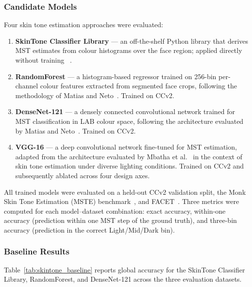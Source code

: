 \subsubsection{Candidate Models}

Four skin tone estimation approaches were evaluated:

\begin{enumerate}
	\item \textbf{SkinTone Classifier Library} --- an off-the-shelf Python library that derives MST estimates from colour histograms over the face region; applied directly without training ~\cite{Pina_2023_SkinToneClassificationLibrary}.
	\item \textbf{RandomForest} --- a histogram-based regressor trained on 256-bin per-channel colour features extracted from segmented face crops, following the methodology of Matias and Neto~\cite{Matias_2024_EnhancingFairnessMST}. Trained on CCv2.
	\item \textbf{DenseNet-121} --- a densely connected convolutional network trained for MST classification in LAB colour space, following the architecture evaluated by Matias and Neto~\cite{Matias_2024_EnhancingFairnessMST}. Trained on CCv2.
	\item \textbf{VGG-16} --- a deep convolutional network fine-tuned for MST estimation, adapted from the architecture evaluated by Mbatha et al.~\cite{Mbatha_2024_SkinToneLighting} in the context of skin tone estimation under diverse lighting conditions. Trained on CCv2 and subsequently ablated across four design axes.
\end{enumerate}

All trained models were evaluated on a held-out CCv2 validation split, the Monk Skin Tone Estimation (MSTE) benchmark~\cite{Mbatha_2024_SkinToneLighting}, and FACET~\cite{Gustafson_2023_FACET}. Three metrics were computed for each model--dataset combination: exact accuracy, within-one accuracy (prediction within one MST step of the ground truth), and three-bin accuracy (prediction in the correct Light/Mid/Dark bin).

\subsubsection{Baseline Results}

Table~\ref{tab:skintone_baseline} reports global accuracy for the SkinTone Classifier Library, RandomForest, and DenseNet-121 across the three evaluation datasets.

